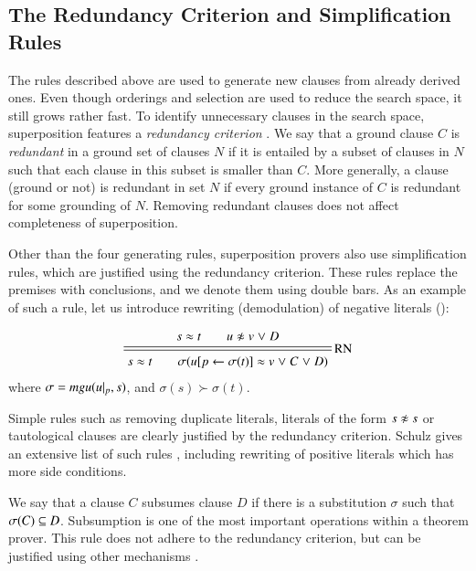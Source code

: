 \medskip

\subsection{The Redundancy Criterion and Simplification Rules}

The rules described above are used to generate new clauses from already derived
ones. Even though orderings and selection are used to reduce the search space,
it still grows rather fast. To identify unnecessary clauses in the search
space, superposition features a \emph{redundancy criterion}
\cite[Sect.~4.2.2]{bg-01-resolution}. We say that a ground clause $C$ is
{\em redundant} in a ground set of clauses $N$ if it is entailed by a subset of
clauses in $N$ such that each clause in this subset is smaller than $C$. More
generally, a clause (ground or not) is redundant in set $N$ if every ground
instance of $C$ is redundant for some grounding of $N$. Removing redundant
clauses does not affect completeness of superposition.

Other than the four generating rules, superposition provers also use
simplification rules, which are justified using the redundancy criterion. These
rules replace the premises with conclusions, and we denote them using double
bars. As an example of such a rule, let us introduce rewriting (demodulation) of
negative literals ():

\[
\namedsimp{RN}{s \eq t \qquad u \noteq v \llor D}
              {s \eq t \qquad \sigmacl{u[p \leftarrow \sigma(t)] \eq v \llor C \llor D}}
\]
where $\sigma = \mathit{mgu}(u|_p, s)$, and $\sigma(s) \succ \sigma(t)$.


Simple rules such as removing duplicate literals, literals of the form $s \noteq
s$ or tautological clauses are clearly justified by the redundancy criterion.
Schulz gives an extensive list of such rules \cite{ss-02-brainiac}, including rewriting of positive
literals which has more side conditions.

We say that a clause $C$ subsumes clause $D$ if there is a substitution $\sigma$
such that $\sigma(C) \subseteq D$. Subsumption is one of the most important
operations within a theorem prover. This rule does not adhere to the redundancy
criterion, but can be justified using other mechanisms \cite{wtrb-20-sat-framework}.

